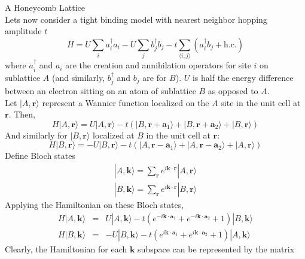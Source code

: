 \documentclass[a4paper,12pt]{article}
\renewcommand{\vec}[1]{\boldsymbol{\mathbf{#1}}}
\begin{document}
\begin{section}{A Honeycomb Lattice}
\begin{equation}
\end{equation}
Lets now consider a tight binding model with nearest neighbor hopping amplitude $t$
\begin{equation}
\label{eq:graphene_hamiltonian}
H= U \sum_i a_i^\dagger a_i- U \sum_j b_j^\dagger b_j - t \sum_{\langle i,j \rangle} \left( a_i^\dagger b_j + \text{h.c.} \right)
\end{equation}
where $a_i^\dagger$ and $a_i$ are the creation and annihilation operators for site $i$ on sublattice $A$ (and similarly, $b_j^\dagger$ and $b_j$ are for $B$).  $U$ is half the energy difference between an electron sitting on an atom of sublattice $B$ as opposed to $A$. \\
Let $|A,\vec{r} \rangle$ represent a Wannier function localized on the $A$ site in the unit cell at $\vec{r}$.  Then,
\begin{equation}
H|A,\vec{r} \rangle = U|A,\vec{r} \rangle -t \left( |B,\vec{r}+\vec{a}_1 \rangle + |B,\vec{r}+\vec{a}_2 \rangle + |B,\vec{r} \rangle \right)
\end{equation}
And similarly for $|B,\vec{r} \rangle$ localized at $B$ in the unit cell at $\vec{r}$:
\begin{equation}
H|B,\vec{r} \rangle = -U|B,\vec{r} \rangle -t \left( |A,\vec{r}-\vec{a}_1 \rangle + |A,\vec{r}-\vec{a}_2 \rangle + |A,\vec{r} \rangle \right)
\end{equation}
Define Bloch states
\begin{eqnarray}
|A, \vec{k} \rangle = \sum_{\vec{r}} e^{i \vec{k} \cdot \vec{r}} |A,\vec{r} \rangle \label{eq:bloch_a} \\
|B, \vec{k} \rangle = \sum_{\vec{r}} e^{i \vec{k} \cdot \vec{r}} |B,\vec{r} \label{eq:bloch_b} \rangle
\end{eqnarray}
Applying the Hamiltonian on these Bloch states,
\begin{eqnarray}
H|A,\vec{k} \rangle %
 &=& U|A,\vec{k} \rangle -t \left( e^{-i \vec{k} \cdot \vec{a}_1}+e^{-i \vec{k} \cdot \vec{a}_2} +1 \right)|B, \vec{k} \rangle \\
H|B,\vec{k} \rangle &=& -U|B,\vec{k} \rangle - t \left( e^{i \vec{k} \cdot \vec{a}_1}+e^{i \vec{k} \cdot \vec{a}_2} +1 \right)|A, \vec{k} \rangle
\end{eqnarray}
Clearly, the Hamiltonian for each $\vec{k}$ subspace can be represented by the matrix

\end{section}
\end{document}
